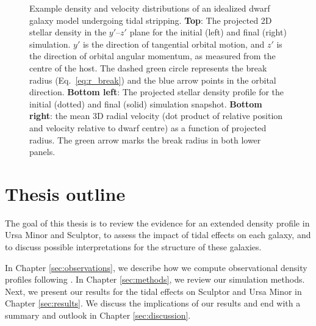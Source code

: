\begin{figure}
\centering
{}
\caption[Example tidal simulation]{Example density and velocity
distributions of an idealized dwarf galaxy model undergoing tidal
stripping. \textbf{Top}: The projected 2D stellar density in the
\(y'\)--\(z'\) plane for the initial (left) and final (right)
simulation. \(y'\) is the direction of tangential orbital motion, and
\(z'\) is the direction of orbital angular momentum, as measured from
the centre of the host. The dashed green circle represents the break
radius (Eq.~\ref{eq:r_break}) and the blue arrow points in the orbital
direction. \textbf{Bottom left}: The projected stellar density profile
for the initial (dotted) and final (solid) simulation snapshot.
\textbf{Bottom right}: the mean 3D radial velocity (dot product of
relative position and velocity relative to dwarf centre) as a function
of projected radius. The green arrow marks the break radius in both
lower panels.}\label{fig:idealized_break_radius}
\end{figure}

\section{Thesis outline}\label{thesis-outline}

The goal of this thesis is to review the evidence for an extended
density profile in Ursa Minor and Sculptor, to assess the impact of
tidal effects on each galaxy, and to discuss possible interpretations
for the structure of these galaxies.

In Chapter \ref{sec:observations}, we describe how we compute
observational density profiles following \citet{jensen+2024}. In Chapter
\ref{sec:methods}, we review our simulation methods. Next, we present
our results for the tidal effects on Sculptor and Ursa Minor in Chapter
\ref{sec:results}. We discuss the implications of our results and end
with a summary and outlook in Chapter \ref{sec:discussion}.
